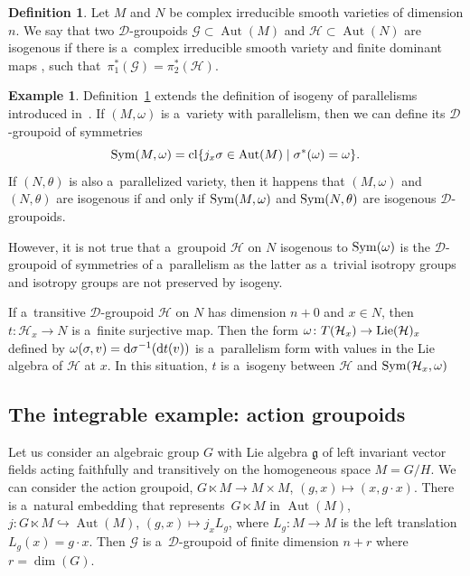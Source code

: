 \documentclass[pdftex]{sigma}
\numberwithin{equation}{section}
\theoremstyle{definition}
\newtheorem{Definition}[Theorem]{Definition}
\newtheorem{Example}[Theorem]{Example}
\begin{document}
\begin{Definition}\label{def_isogeny}
Let $M$ and $N$ be complex irreducible smooth varieties of dimension $n$. We say that two $\mathcal D$-groupoids $\mathcal G \subset \operatorname{Aut}(M)$ and $\mathcal H \subset\operatorname{Aut}(N)$ are isogenous if there is a~complex irreducible smooth variety  and finite dominant maps ,  such that~${\pi_1^\ast(\mathcal G) = \pi_2^*(\mathcal H)}$.
\end{Definition}

\begin{Example}
Definition~\ref{def_isogeny} extends the definition of isogeny of parallelisms introduced in~\cite[Definition 2.7]{bc2017}. If $(M,\omega)$ is a~variety with parallelism, then we can define its $\mathcal D$-groupoid of symmetries
\[{\rm Sym}(M,\omega) = {\rm cl}\{j_x\sigma \in \operatorname{Aut}(M)\mid \sigma^*(\omega) = \omega \}.\]
If $(N,\theta)$ is also a~parallelized variety, then it happens that $(M,\omega)$ and $(N,\theta)$ are isogenous if and only if ${\rm Sym}(M,\omega)$ and ${\rm Sym}(N,\theta)$ are isogenous $\mathcal D$-groupoids.

However, it is not true that a~groupoid $\mathcal H$ on $N$ isogenous to ${\rm Sym}(\omega)$ is the $\mathcal D$-groupoid of symmetries of a~parallelism as the latter as a~trivial isotropy groups and isotropy groups are not preserved by isogeny.

If a~transitive $\mathcal D$-groupoid $\mathcal H$ on $N$ has dimension $n+0$ and $x \in N$, then $t \colon \mathcal H_x \to N$ is a~finite surjective map. Then the form $\omega \colon T(\mathcal H_x) \to {\rm Lie}(\mathcal H)_x$ defined by $\omega(\sigma, v) = {\rm d}\sigma^{-1}({\rm d}t(v))$ is a~parallelism form with values in the Lie algebra of $\mathcal H$ at $x$.
In this situation, $t$ is a~isogeny between $\mathcal H$ and ${\rm Sym}(\mathcal H_x,\omega)$
\end{Example}


\subsection{The integrable example: action groupoids}\label{ss_actiongroupoids}

Let us consider an algebraic group $G$ with Lie algebra $\mathfrak g$ of left invariant vector fields acting faithfully and transitively on the homogeneous space $M = G/H$. We can consider the action groupoid,
$G\ltimes M \to M\times M$, $ (g, x) \mapsto (x, g\cdot x)$.
There is a~natural embedding that represents~${G\ltimes M}$ in $\operatorname{Aut}(M)$,
$j\colon G\ltimes M \hookrightarrow \operatorname{Aut}(M)$, $ (g, x) \mapsto j_x L_g$,
where $L_g\colon M\to M$ is the left translation $L_g(x) = g\cdot x$. Then $\mathcal G$ is a~$\mathcal D$-groupoid of finite dimension $n + r$ where $r = {\dim}(G)$.
\end{document}
